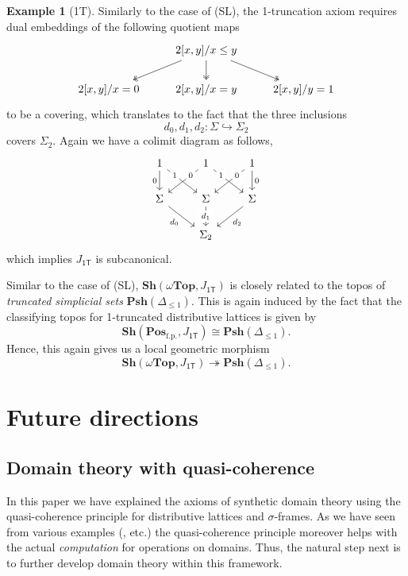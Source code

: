 \documentclass[12pt]{amsart}
\theoremstyle{definition}
\newtheorem{example}[theorem]{Example}
\newcommand{\mb}[1]{\mathbf{#1}}
\newcommand{\mr}[1]{\mathrm{#1}}
\newcommand{\ms}[1]{\mathsf{#1}}
\newcommand{\Pos}{\mb{Pos}}
\newcommand{\sh}{\mb{Sh}}
\newcommand{\psh}{\mb{Psh}}
\newcommand{\surj}{\twoheadrightarrow}
\newcommand{\hook}{\hookrightarrow}
\newcommand{\fp}{_{\mr{f.p.}}}
\newcommand{\wTop}{\omega\mb{Top}}
\begin{document}
\begin{example}[1T]\label{exm:model1T}
  Similarly to the case of (SL), the 1-truncation axiom requires dual embeddings of the following quotient maps
  \[\begin{tikzcd}
    & {2[x,y]/x\le y} \\
    {2[x,y]/x=0} & {2[x,y]/x=y} & {2[x,y]/y=1}
    \arrow[two heads, from=1-2, to=2-1]
    \arrow[two heads, from=1-2, to=2-2]
    \arrow[two heads, from=1-2, to=2-3]
  \end{tikzcd}\]
  to be a covering, which translates to the fact that the three inclusions
  \[ d_0,d_1,d_2 : \Sigma \hook \Sigma_2 \]
  covers $\Sigma_2$. Again we have a colimit diagram as follows, 
  \[\begin{tikzcd}
    1 & 1 & 1 \\
    \Sigma & \Sigma & \Sigma \\
    & {\Sigma_2}
    \arrow["0"', from=1-1, to=2-1]
    \arrow["1"{description, pos=0.25}, from=1-1, to=2-2]
    \arrow["0"{description, pos=0.25}, from=1-2, to=2-1]
    \arrow["1"{description, pos=0.25}, from=1-2, to=2-3]
    \arrow["0"{description, pos=0.25}, from=1-3, to=2-2]
    \arrow["0", from=1-3, to=2-3]
    \arrow["{d_0}"', from=2-1, to=3-2]
    \arrow["{d_1}"{description}, from=2-2, to=3-2]
    \arrow["{d_2}", from=2-3, to=3-2]
  \end{tikzcd}\]
  which implies $J_{\ms{1T}}$ is subcanonical.
  
  Similar to the case of (SL), $\sh(\wTop,J_{\ms{1T}})$ is closely related to the topos of \emph{truncated simplicial sets} $\psh(\Delta_{\le 1})$. This is again induced by the fact that the classifying topos for 1-truncated distributive lattices is given by 
  \[ \sh(\Pos\fp,J_{\ms{1T}}) \cong \psh(\Delta_{\le 1}). \]
  Hence, this again gives us a local geometric morphism
  \[ \sh(\wTop,J_{\ms{1T}}) \surj \psh(\Delta_{\le 1}). \]
\end{example}


\section{Future directions}

\subsection{Domain theory with quasi-coherence}

In this paper we have explained the axioms of synthetic domain theory using the quasi-coherence principle for distributive lattices and $\sigma$-frames. As we have seen from various examples (, etc.) the quasi-coherence principle moreover helps with the actual \emph{computation} for operations on domains. Thus, the natural step next is to further develop domain theory within this framework.
\end{document}
